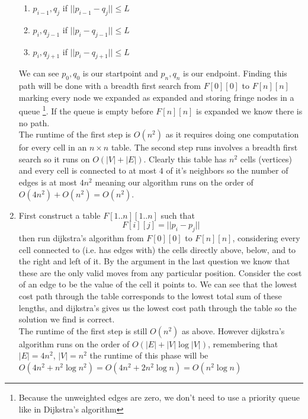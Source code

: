 \documentclass[11pt]{article}
\begin{document}
\begin{enumerate}
\begin{enumerate}
			\item $p_{i-1},q_{j}$ if $|| p_{i-1} - q_{j}|| \leq L$
			\item $p_{i},q_{j-1}$ if $|| p_{i} - q_{j-1}|| \leq L$
			\item $p_{i},q_{j+1}$ if $|| p_{i} - q_{j+1}|| \leq L$
			\end{enumerate}
			We can see $p_0,q_0$ is our startpoint and $p_n,q_n$ is
			our endpoint.
			Finding this path will be done with a breadth first
			search from $F[0][0]$ to $F[n][n]$
			marking every node we expanded as expanded and storing
			fringe nodes in a queue \footnote{Because the unweighted edges
			are zero, we don't need to use a priority queue like in
			Dijkstra's algorithm}. If the queue is empty before
			$F[n][n]$ is expanded we know there is no path.\\
			The runtime of the first step is $O(n^2)$ as it requires
			doing one computation for every cell in an $n \times n$
			table.
			The second step runs involves a breadth first search so
			it runs on $O(|V| + |E|)$. Clearly this table has $n^2$
			cells (vertices) and every cell is connected to at most
			$4$ of it's neighbors so the number of edges is at most
			$4n^2$ meaning our algorithm runs on the order of $
			O(4n^2)+ O(n^2) = O(n^2)$.
		\item First construct a table $F[1..n][1..n]$ such that 
				$$F[i][j] = || p_i - p_j ||$$
			then run dijkstra's algorithm from $F[0][0]$ to $F[n][n]$,
			considering every cell connected to (i.e. has edges with) the
			cells directly above, below, and to the right and left
			of it. By the argument in the last question we know that
			these are the only valid moves from any particular
			position. Consider the cost of an
			edge to be the value of the cell it points to. We can
			see that the lowest cost path through the table
			corresponds to the lowest total sum of these lengths,
			and dijkstra's gives us the lowest cost path through
			the table so the solution we find is correct.\\
			The runtime of the first step is still $O(n^2)$ as
			above. However dijkstra's algorithm runs on the order of
			$O(|E|+ |V|\log|V|)$, remembering that $|E| = 4n^2$,
			$|V| = n^2$ the runtime of this phase will be $O(4n^2 +
			n^2 \log{n^2}) = O(4n^2 + 2n^2\log{n}) = O(n^2\log{n})$
\end{enumerate}
\end{document}
